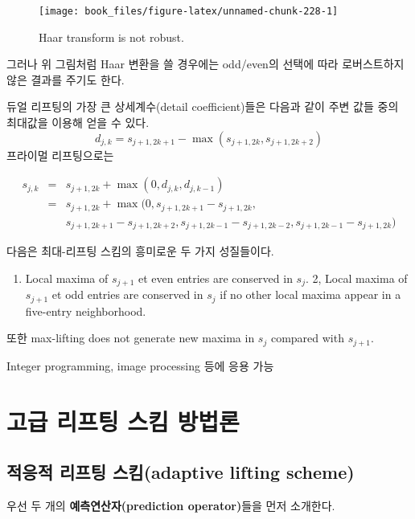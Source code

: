 \documentclass[b5paper,]{scrbook}
\providecommand{\tightlist}{%
  \setlength{\itemsep}{0pt}\setlength{\parskip}{0pt}}
\theoremstyle{plain}
\theoremstyle{definition}
\numberwithin{equation}{section}
\begin{document}
\begin{figure}

{\centering \texttt{[image: book\_files/figure-latex/unnamed-chunk-228-1]} 

}

\caption{Haar transform is not robust.}\label{fig:unnamed-chunk-228}
\end{figure}

그러나 위 그림처럼 Haar 변환을 쓸 경우에는 odd/even의 선택에 따라
로버스트하지 않은 결과를 주기도 한다.

듀얼 리프팅의 가장 큰 상세계수(detail coefficient)들은 다음과 같이 주변
값들 중의 최대값을 이용해 얻을 수 있다.
\[d_{j,k}=s_{j+1,2k+1}-\max(s_{j+1,2k},s_{j+1,2k+2})\] 프라이멀
리프팅으로는

\begin{eqnarray*}
s_{j,k}&=& s_{j+1,2k}+\max (0,d_{j,k},d_{j,k-1})\\
&=&s_{j+1,2k}+\max (0, s_{j+1,2k+1}-s_{j+1,2k}, \\
& &s_{j+1,2k+1}-s_{j+1,2k+2}, s_{j+1,2k-1}-s_{j+1,2k-2}, s_{j+1,2k-1}-s_{j+1,2k})
\end{eqnarray*}

다음은 최대-리프팅 스킴의 흥미로운 두 가지 성질들이다.

\begin{enumerate}
\def\labelenumi{\arabic{enumi}.}
\tightlist
\item
  Local maxima of \(s_{j+1}\) et even entries are conserved in
  \(s_{j}\). 2, Local maxima of \(s_{j+1}\) et odd entries are conserved
  in \(s_{j}\) if no other local maxima appear in a five-entry
  neighborhood.
\end{enumerate}

또한 max-lifting does not generate new maxima in \(s_{j}\) compared with
\(s_{j+1}\).

Integer programming, image processing 등에 응용 가능

\chapter{고급 리프팅 스킴 방법론}\label{advlifting}

\section{적응적 리프팅 스킴(adaptive lifting
scheme)}\label{--adaptive-lifting-scheme}

우선 두 개의 \textbf{예측연산자(prediction operator)}들을 먼저 소개한다.
\end{document}
